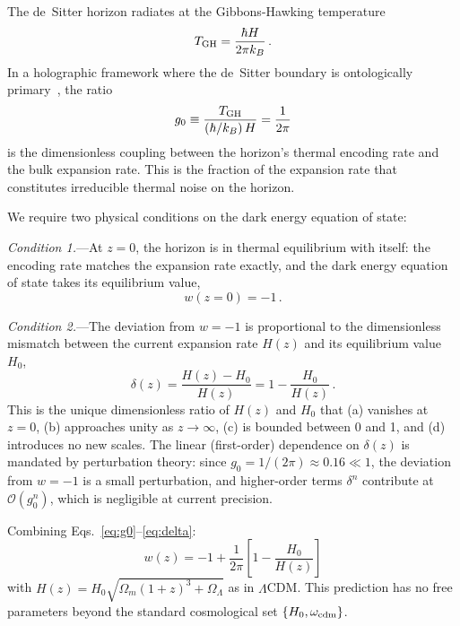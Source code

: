 \documentclass[aps,prl,twocolumn,showpacs,preprintnumbers,amsmath,amssymb,superscriptaddress]{revtex4-2}
\begin{document}
The de~Sitter horizon radiates at the Gibbons-Hawking 
temperature~\cite{GH1977}
\begin{equation}
T_{\rm GH} = \frac{\hbar H}{2\pi k_B}\,.
\label{eq:TGH}
\end{equation}
In a holographic framework where the de~Sitter boundary is ontologically 
primary~\cite{Bousso2002,Susskind1995}, the ratio
\begin{equation}
g_0 \equiv \frac{T_{\rm GH}}{(\hbar/k_B)\,H} = \frac{1}{2\pi}
\label{eq:g0}
\end{equation}
is the dimensionless coupling between the horizon's thermal encoding 
rate and the bulk expansion rate. This is the fraction of the expansion 
rate that constitutes irreducible thermal noise on the horizon.

We require two physical conditions on the dark energy equation of state:

\noindent\textit{Condition 1.}---At $z=0$, the horizon is in thermal 
equilibrium with itself: the encoding rate matches the expansion rate 
exactly, and the dark energy equation of state takes its equilibrium 
value,
\begin{equation}
w(z{=}0) = -1\,.
\label{eq:cond1}
\end{equation}

\noindent\textit{Condition 2.}---The deviation from $w=-1$ is 
proportional to the dimensionless mismatch between the current expansion 
rate $H(z)$ and its equilibrium value $H_0$,
\begin{equation}
\delta(z) = \frac{H(z) - H_0}{H(z)} = 1 - \frac{H_0}{H(z)}\,.
\label{eq:delta}
\end{equation}
This is the unique dimensionless ratio of $H(z)$ and $H_0$ that 
(a) vanishes at $z=0$, (b) approaches unity as $z \to \infty$, 
(c) is bounded between 0 and 1, and (d) introduces no new scales.
The linear (first-order) dependence on $\delta(z)$ is mandated by 
perturbation theory: since $g_0 = 1/(2\pi) \approx 0.16 \ll 1$, 
the deviation from $w=-1$ is a small perturbation, and higher-order 
terms $\delta^n$ contribute at $\mathcal{O}(g_0^n)$, which is 
negligible at current precision.

Combining Eqs.~\eqref{eq:g0}--\eqref{eq:delta}:
\begin{equation}
\boxed{w(z) = -1 + \frac{1}{2\pi}\left[1 - \frac{H_0}{H(z)}\right]}
\label{eq:wz}
\end{equation}
with $H(z) = H_0\sqrt{\Omega_m(1+z)^3 + \Omega_\Lambda}$ as in 
$\Lambda$CDM. This prediction has no free parameters beyond 
the standard cosmological set $\{H_0, \omega_{\rm cdm}\}$.
\end{document}
